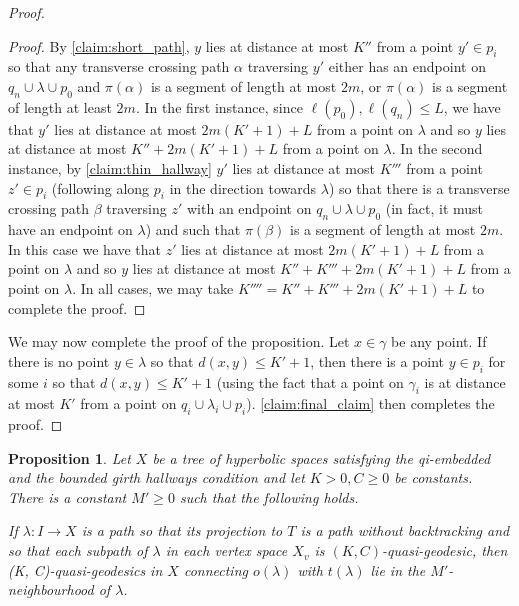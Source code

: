 \documentclass[11pt, a4paper]{amsart}
\newtheorem{proposition}[theorem]{Proposition}
\theoremstyle{definition}
\DeclareMathOperator{\len}{\ell}
\newcounter{cases}
\begin{document}
\begin{proof}
\begin{proof}
By \cref{claim:short_path}, $y$ lies at distance at most $K''$ from a point $y'\in p_i$ so that any transverse crossing path $\alpha$ traversing $y'$ either has an endpoint on $q_n\cup\lambda\cup p_0$ and $\pi(\alpha)$ is a segment of length at most $2m$, or $\pi(\alpha)$ is a segment of length at least $2m$. In the first instance, since $\len(p_0), \len(q_n)\leqslant L$, we have that $y'$ lies at distance at most $2m(K'+1) + L$ from a point on $\lambda$ and so $y$ lies at distance at most $K'' + 2m(K'+1) + L$ from a point on $\lambda$. In the second instance, by \cref{claim:thin_hallway} $y'$ lies at distance at most $K'''$ from a point $z'\in p_i$ (following along $p_i$ in the direction towards $\lambda$) so that there is a transverse crossing path $\beta$ traversing $z'$ with an endpoint on $q_n\cup \lambda\cup p_0$ (in fact, it must have an endpoint on $\lambda$) and such that $\pi(\beta)$ is a segment of length at most $2m$. In this case we have that $z'$ lies at distance at most $2m(K'+1) + L$ from a point on $\lambda$ and so $y$ lies at distance at most $K'' + K''' + 2m(K'+1) + L$ from a point on $\lambda$. In all cases, we may take $K'''' = K'' + K''' + 2m(K'+1) + L$ to complete the proof.
\end{proof}


We may now complete the proof of the proposition. Let $x\in \gamma$ be any point. If there is no point $y\in \lambda$ so that $d(x, y)\leqslant K'+1$, then there is a point $y\in p_i$ for some $i$ so that $d(x, y)\leqslant K' + 1$ (using the fact that a point on $\gamma_i$ is at distance at most $K'$ from a point on $q_i\cup\lambda_i\cup p_i$). \cref{claim:final_claim} then completes the proof.
\end{proof}



\begin{proposition}
\label{prop:concatenated_qg_track_1}
Let $X$ be a tree of hyperbolic spaces satisfying the qi-embedded and the bounded girth hallways condition and let $K> 0, C\geqslant 0$ be constants. There is a constant $M'\geqslant 0$ such that the following holds.

If $\lambda \colon I \to X$ is a path so that its projection to $T$ is a path without backtracking and so that each subpath of $\lambda$ in each vertex space $X_v$ is $(K, C)$-quasi-geodesic, then (K, C)-quasi-geodesics in $X$ connecting $o(\lambda)$ with $t(\lambda)$ lie in the $M'$-neighbourhood of $\lambda$.
\end{proposition}
\end{document}
